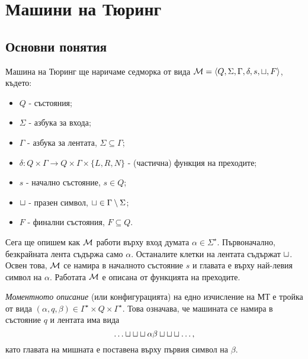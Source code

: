 \chapter{Машини на Тюринг}

\newcommand{\tape}[1]{\dots\blank\blank\blank{#1}\blank\blank\blank\dots}

\section{Основни понятия}
Машина на Тюринг ще наричаме седморка от вида $\mathcal{M} = \langle{Q,\Sigma,\Gamma,\delta,s,\sqcup,F}\rangle$, където:
\begin{itemize}
\item 
  $Q$ - състояния;
\item
  $\Sigma$ - азбука за входа;
\item
  $\Gamma$ - азбука за лентата, $\Sigma \subseteq \Gamma$;
\item
  $\delta:Q\times\Gamma \to Q\times \Gamma \times \{L,R,N\}$ - (частична) функция на преходите;
\item
  $s$ - начално състояние, $s \in Q$;
\item
  $\sqcup$ - празен символ,  $\sqcup \in \Gamma \setminus \Sigma$;
\item
  $F$ - финални състояния, $F \subseteq Q$.
\end{itemize}

Сега ще опишем как $\mathcal{M}$ работи върху вход думата $\alpha \in \Sigma^\star$.
Първоначално, безкрайната лента съдържа само $\alpha$. Останалите клетки на лентата съдържат $\sqcup$.
Освен това, $\mathcal{M}$ се намира в началното състояние $s$ и главата е върху най-левия символ на $\alpha$.
Работата $\mathcal{M}$ е описана от функцията на преходите.
  
{\em Моментното описание} (или конфигурацията) на едно изчисление на МТ е тройка от вида $(\alpha, q, \beta) \in \Gamma^\star\times Q \times \Gamma^\star$. Това означава, че
машината се намира в състояние $q$ и лентата има вида
\[\tape{\alpha\beta},\]
като главата на мишната е поставена върху първия символ на $\beta$.

